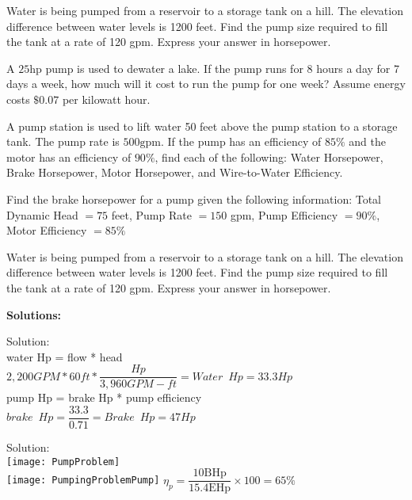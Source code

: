   Water is being pumped from a reservoir to a storage tank on a hill. The elevation difference between water levels is 1200 feet. Find the pump size required to fill the tank at a rate of 120 gpm. Express your answer in horsepower.

  A $25 \mathrm{hp}$ pump is used to dewater a lake. If the pump runs for 8 hours a day for 7 days a week, how much will it cost to run the pump for one week? Assume energy costs $\$ 0.07$ per kilowatt hour.

  A pump station is used to lift water 50 feet above the pump station to a storage tank. The pump rate is $500 \mathrm{gpm}$. If the pump has an efficiency of $85 \%$ and the motor has an efficiency of $90 \%$, find each of the following: Water Horsepower, Brake Horsepower, Motor Horsepower, and Wire-to-Water Efficiency.


  Find the brake horsepower for a pump given the following information: Total Dynamic Head $=75$ feet, Pump Rate $=150$ gpm, Pump Efficiency $=90 \%$, Motor Efficiency $=85 \%$

  Water is being pumped from a reservoir to a storage tank on a hill. The elevation difference between water levels is 1200 feet. Find the pump size required to fill the tank at a rate of 120 gpm. Express your answer in horsepower.




\textbf{Solutions:}



 Solution:\\
\vspace{0.4cm}
water Hp = flow * head\\
$2,200GPM*60ft*\dfrac{Hp}{3,960 GPM-ft}=\boxed{Water \enspace Hp = 33.3Hp}$\\
\vspace{0.4cm}
pump Hp = brake Hp * pump efficiency\\
$brake \enspace Hp = \dfrac{33.3}{0.71}=\boxed{Brake \enspace Hp=47Hp}$
 \vspace{0.2cm}

 Solution:\\ 
 \vspace{0.2cm}
 \vspace{0.4cm}\texttt{[image: PumpProblem]}\\
 \vspace{0.2cm}
 \texttt{[image: PumpingProblemPump]}
 $\eta_p=\dfrac{10 \mathrm{BHp}}{15.4 \mathrm{EHp}} \times 100=\boxed{65 \%}$
 \vspace{0.2cm}
 
